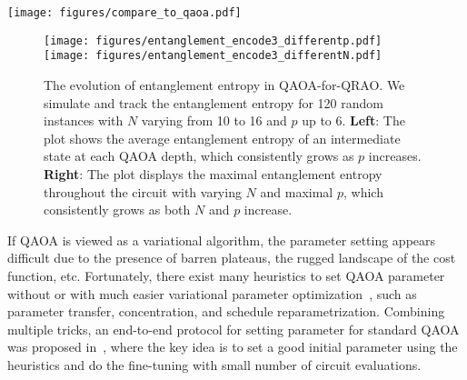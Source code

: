 \documentclass[conference,10pt]{IEEEtran}
\newcommand{\QAOAQRAO}{QAOA-for-QRAO}
\begin{document}
\begin{figure*}[t]
    \centering
    \texttt{[image: figures/compare\_to\_qaoa.pdf]}
    \caption{Comparison between \QAOAQRAO{} and QAOA. 
    \textbf{A} We report the performance of QAOA and \QAOAQRAO{} in both noiseless and noisy simulations. The results are averaged over $10$ random instances with $N=20$ and $p$ up to 6. QAOA uses the fixed angles from \cite{wurtz2021fixed}, while \QAOAQRAO{} employs fixed parameters from Section~\ref{sec:set_parameter} and is approximately implemented with Grouped Trotter at $T=2$. QAOA outperforms \QAOAQRAO{} in terms of $\alpha_c$.
    \textbf{B} Fixing $p=6$, we scale the noise levels in the noisy simulation, with a noise scale of 1 representing the noise model emulation of Quantinuum's H1-1 quantum computer. The performance of both methods scales reasonably with respect to the noise level. Shaded regions indicate the standard errors.
    \textbf{C} We examine 30 random instances for each $N$ and report the average number of qubits required to solve problems with varying $N$. The standard error for \QAOAQRAO{} is too small to be visible. 
    This highlights a trade-off between performance and quantum resources required when using \QAOAQRAO{}. 
    } 
    \label{fig:qrao_vs_qaoa}
\end{figure*}
\begin{figure}[t]
    \centering
    \texttt{[image: figures/entanglement\_encode3\_differentp.pdf]}
    \texttt{[image: figures/entanglement\_encode3\_differentN.pdf]}
    \caption{The evolution of entanglement entropy in \QAOAQRAO{}. We simulate and track the entanglement entropy for 120 random instances with $N$ varying from 10 to 16 and $p$ up to 6.
    \textbf{Left}: The plot shows the average entanglement entropy of an intermediate state at each QAOA depth, which consistently grows as $p$ increases.
    \textbf{Right}: The plot displays the maximal entanglement entropy throughout the circuit with varying $N$ and maximal $p$, which consistently grows as both $N$ and $p$ increase.} 
    \label{fig:entanglement_evolution}
\end{figure}
If QAOA is viewed as a variational algorithm, the parameter setting appears difficult due to the presence of barren plateaus,
the rugged landscape of the cost function, etc. Fortunately, there exist many heuristics to set QAOA parameter without or with much easier variational parameter optimization~\cite{he2024parameter}, such as parameter transfer, concentration, and schedule reparametrization. Combining multiple tricks, an end-to-end protocol for setting parameter for standard QAOA was proposed in~\cite{hao2024end}, where the key idea is to set a good initial parameter using the heuristics and do the fine-tuning with small number of circuit evaluations.
\end{document}
